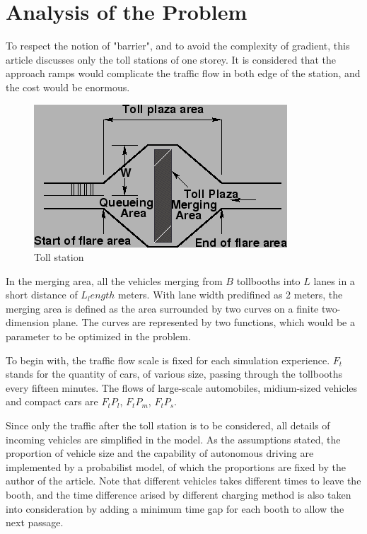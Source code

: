 \documentclass{mcmthesis}
\begin{document}
\section{Analysis of the Problem}

To respect the notion of "barrier", and to avoid the complexity of gradient, this article discusses only the toll stations of one storey. It is considered that the approach ramps would complicate the traffic flow in both edge of the station, and the cost would be enormous.

\begin{figure}[htbp]
\small
\centering
\caption{Toll station \cite{note}} \label{fig:Ts}
\includegraphics{img3.png}
\end{figure}


In the merging area, all the vehicles merging from $B$ tollbooths into $L$ lanes in a short distance of $L_length$ meters.
With lane width predifined as 2 meters, the merging area is defined as the area surrounded by two curves on a finite two-dimension plane. The curves are represented by two functions, which would be a parameter to be optimized in the problem.

To begin with, the traffic flow scale is fixed for each simulation experience. $F_t$ stands for the quantity of cars, of various size, passing through the tollbooths every fifteen minutes. The flows of large-scale automobiles, midium-sized vehicles and compact cars are $F_tP_l$, $F_tP_m$, $F_tP_s$.

Since only the traffic after the toll station is to be considered, all details of incoming vehicles are simplified in the model. As the assumptions stated, the proportion of vehicle size and the capability of autonomous driving are implemented by a probabilist model, of which the proportions are fixed by the author of the article. Note that different vehicles takes different times to leave the booth, and the time difference arised by different charging method is also taken into consideration by adding a minimum time gap for each booth to allow the next passage.
\end{document}
